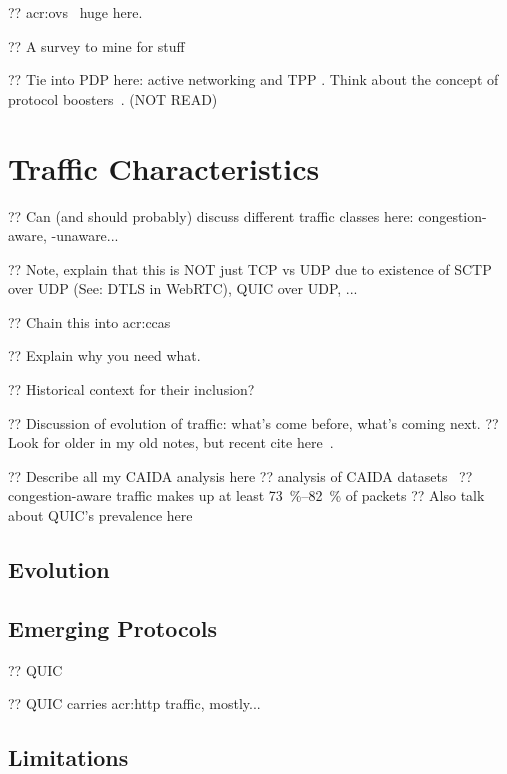 ?? \gls{acr:ovs}~\parencite{DBLP:conf/nsdi/PfaffPKJZRGWSSA15} huge here.

?? A survey to mine for stuff~\parencite{DBLP:journals/comsur/NunesMNOT14}

?? Tie into PDP here: active networking and TPP . Think about the concept of protocol boosters~\parencite{DBLP:journals/jsac/FeldmeierMSBMR98}. (NOT READ)

\section{Traffic Characteristics}

?? Can (and should probably) discuss different traffic classes here: congestion-aware, -unaware...

?? Note, explain that this is NOT just TCP vs UDP due to existence of SCTP over UDP (See: DTLS in WebRTC), QUIC over UDP, ...

?? Chain this into \glspl{acr:cca}

?? Explain why you need what.

?? Historical context for their inclusion?

?? Discussion of evolution of traffic: what's come before, what's coming next.
?? Look for older in my old notes, but recent cite here~\parencite{DBLP:conf/anrw/BauerJHBC21}.

?? Describe all my CAIDA analysis here
?? analysis of CAIDA datasets~\parencite{caida-2018-passive}
?? congestion-aware traffic makes up at least \qtyrange{73}{82}{\percent} of packets
?? Also talk about QUIC's prevalence here

\subsection{Evolution}

\subsection{Emerging Protocols}

?? QUIC~\parencite{DBLP:conf/sigcomm/LangleyRWVKZYKS17}

?? QUIC carries \gls{acr:http} traffic, mostly...

\subsection{Limitations}

